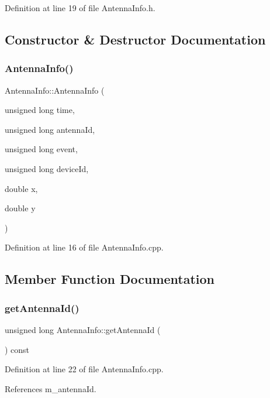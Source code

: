 Definition at line 19 of file Antenna\+Info.\+h.



\subsection{Constructor \& Destructor Documentation}
\mbox{\label{class_antenna_info_a3844c960562688818ed9d9cb2bde82d7}} 
\subsubsection{AntennaInfo()}
{\footnotesize\ttfamily Antenna\+Info\+::\+Antenna\+Info (\begin{DoxyParamCaption}\item[{unsigned long}]{time,  }\item[{unsigned long}]{antenna\+Id,  }\item[{unsigned long}]{event,  }\item[{unsigned long}]{device\+Id,  }\item[{double}]{x,  }\item[{double}]{y }\end{DoxyParamCaption})}



Definition at line 16 of file Antenna\+Info.\+cpp.



\subsection{Member Function Documentation}
\mbox{\label{class_antenna_info_a1aee619b1f3d45e3da945f17d8531bbf}} 
\subsubsection{getAntennaId()}
{\footnotesize\ttfamily unsigned long Antenna\+Info\+::get\+Antenna\+Id (\begin{DoxyParamCaption}{ }\end{DoxyParamCaption}) const}



Definition at line 22 of file Antenna\+Info.\+cpp.



References m\+\_\+antenna\+Id.

